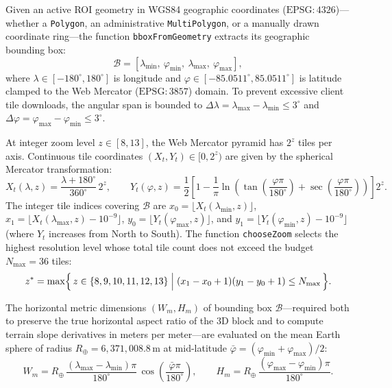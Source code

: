 \documentclass[11pt,a4paper]{article}
\newcommand{\unit}[1]{\mathrm{#1}}
\begin{document}
Given an active ROI geometry in WGS84 geographic coordinates ($\mathrm{EPSG}{:}4326$)---whether a \texttt{Polygon}, an administrative \texttt{MultiPolygon}, or a manually drawn coordinate ring---the function \texttt{bboxFromGeometry} extracts its geographic bounding box:
\begin{equation}
  \mathcal{B} = [\lambda_{\min},\ \varphi_{\min},\ \lambda_{\max},\ \varphi_{\max}],
  \label{eq:bbox-relieve}
\end{equation}
where $\lambda\in[-180^\circ,180^\circ]$ is longitude and $\varphi\in[-85.0511^\circ,85.0511^\circ]$ is latitude clamped to the Web Mercator ($\mathrm{EPSG}{:}3857$) domain. To prevent excessive client tile downloads, the angular span is bounded to $\Delta\lambda = \lambda_{\max}-\lambda_{\min}\le 3^\circ$ and $\Delta\varphi = \varphi_{\max}-\varphi_{\min}\le 3^\circ$.

At integer zoom level $z\in[8,13]$, the Web Mercator pyramid has $2^z$ tiles per axis. Continuous tile coordinates $(X_t,Y_t)\in[0,2^z)$ are given by the spherical Mercator transformation:
\begin{equation}
  X_t(\lambda,z) = \frac{\lambda + 180^\circ}{360^\circ}\,2^z,
  \qquad
  Y_t(\varphi,z) = \frac{1}{2}\left[
    1 - \frac{1}{\pi}\ln\!\left(\tan\!\left(\frac{\varphi\pi}{180^\circ}\right)
    + \sec\!\left(\frac{\varphi\pi}{180^\circ}\right)\right)
  \right] 2^z .
  \label{eq:mercator-tiles}
\end{equation}
The integer tile indices covering $\mathcal{B}$ are $x_0=\lfloor X_t(\lambda_{\min},z)\rfloor$, $x_1=\lfloor X_t(\lambda_{\max},z)-10^{-9}\rfloor$, $y_0=\lfloor Y_t(\varphi_{\max},z)\rfloor$, and $y_1=\lfloor Y_t(\varphi_{\min},z)-10^{-9}\rfloor$ (where $Y_t$ increases from North to South). The function \texttt{chooseZoom} selects the highest resolution level whose total tile count does not exceed the budget $N_{\max}=36$ tiles:
\begin{equation}
  z^\ast = \max\Bigl\{\, z\in\{8,9,10,11,12,13\} \;\Big|\;
  (x_1 - x_0 + 1)(y_1 - y_0 + 1) \le N_{\max} \,\Bigr\}.
  \label{eq:choose-zoom}
\end{equation}

The horizontal metric dimensions $(W_m,H_m)$ of bounding box $\mathcal{B}$---required both to preserve the true horizontal aspect ratio of the 3D block and to compute terrain slope derivatives in meters per meter---are evaluated on the mean Earth sphere of radius $R_\oplus = 6,371,008.8\,\unit{m}$ at mid-latitude $\bar\varphi = (\varphi_{\min}+\varphi_{\max})/2$:
\begin{equation}
  W_m = R_\oplus\,\frac{(\lambda_{\max}-\lambda_{\min})\pi}{180^\circ}\,\cos\!\left(\frac{\bar\varphi\pi}{180^\circ}\right),
  \qquad
  H_m = R_\oplus\,\frac{(\varphi_{\max}-\varphi_{\min})\pi}{180^\circ}.
  \label{eq:bbox-metros}
\end{equation}
\end{document}
